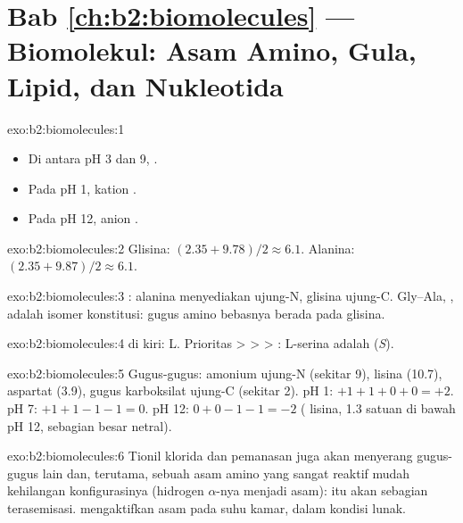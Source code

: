 \section*{Bab \ref{ch:b2:biomolecules} --- Biomolekul: Asam Amino, Gula, Lipid, dan Nukleotida}

\begin{solution}{exo:b2:biomolecules:1}
\begin{itemize}
  \item Di antara pH 3 dan 9,  .
  \item Pada pH 1, kation .
  \item Pada pH 12, anion .
\end{itemize}
\end{solution}

\begin{solution}{exo:b2:biomolecules:2}
Glisina: $(2.35 + 9.78)/2 \approx 6.1$. Alanina: $(2.35 + 9.87)/2 \approx 6.1$.
\end{solution}

\begin{solution}{exo:b2:biomolecules:3}
: alanina menyediakan ujung-N, glisina ujung-C.
Gly--Ala, , adalah isomer konstitusi: gugus
amino bebasnya berada pada glisina.
\end{solution}

\begin{solution}{exo:b2:biomolecules:4}
 di kiri: L. Prioritas  >  >  > : L-serina adalah
(\textit{S}).
\end{solution}

\begin{solution}{exo:b2:biomolecules:5}
Gugus-gugus: amonium ujung-N (sekitar 9),  lisina (10.7),
 aspartat (3.9), gugus karboksilat ujung-C (sekitar 2). pH 1:
$+1 +1 + 0 + 0 = +2$. pH 7: $+1 +1 -1 -1 = 0$. pH 12:
$0 + 0 - 1 - 1 = -2$ ( lisina, 1.3 satuan di bawah pH 12,
sebagian besar netral).
\end{solution}

\begin{solution}{exo:b2:biomolecules:6}
Tionil klorida dan pemanasan juga akan menyerang gugus-gugus lain dan,
terutama,  sebuah asam amino yang sangat reaktif mudah
kehilangan konfigurasinya (hidrogen $\alpha$-nya menjadi asam):  itu
akan sebagian terasemisasi.  mengaktifkan asam pada suhu
kamar, dalam kondisi lunak.
\end{solution}

